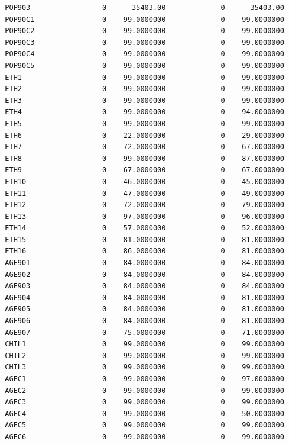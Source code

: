 \documentclass[
  11pt,
  a4paper,
  DIV=12,captions=tableheading,oneside,titlepage]{scrbook}
\begin{document}
\begin{verbatim}
  POP903                 0      35403.00             0      35403.00 
  POP90C1                0    99.0000000             0    99.0000000 
  POP90C2                0    99.0000000             0    99.0000000 
  POP90C3                0    99.0000000             0    99.0000000 
  POP90C4                0    99.0000000             0    99.0000000 
  POP90C5                0    99.0000000             0    99.0000000 
  ETH1                   0    99.0000000             0    99.0000000 
  ETH2                   0    99.0000000             0    99.0000000 
  ETH3                   0    99.0000000             0    99.0000000 
  ETH4                   0    99.0000000             0    94.0000000 
  ETH5                   0    99.0000000             0    99.0000000 
  ETH6                   0    22.0000000             0    29.0000000 
  ETH7                   0    72.0000000             0    67.0000000 
  ETH8                   0    99.0000000             0    87.0000000 
  ETH9                   0    67.0000000             0    67.0000000 
  ETH10                  0    46.0000000             0    45.0000000 
  ETH11                  0    47.0000000             0    49.0000000 
  ETH12                  0    72.0000000             0    79.0000000 
  ETH13                  0    97.0000000             0    96.0000000 
  ETH14                  0    57.0000000             0    52.0000000 
  ETH15                  0    81.0000000             0    81.0000000 
  ETH16                  0    86.0000000             0    81.0000000 
  AGE901                 0    84.0000000             0    84.0000000 
  AGE902                 0    84.0000000             0    84.0000000 
  AGE903                 0    84.0000000             0    84.0000000 
  AGE904                 0    84.0000000             0    81.0000000 
  AGE905                 0    84.0000000             0    81.0000000 
  AGE906                 0    84.0000000             0    81.0000000 
  AGE907                 0    75.0000000             0    71.0000000 
  CHIL1                  0    99.0000000             0    99.0000000 
  CHIL2                  0    99.0000000             0    99.0000000 
  CHIL3                  0    99.0000000             0    99.0000000 
  AGEC1                  0    99.0000000             0    97.0000000 
  AGEC2                  0    99.0000000             0    99.0000000 
  AGEC3                  0    99.0000000             0    99.0000000 
  AGEC4                  0    99.0000000             0    50.0000000 
  AGEC5                  0    99.0000000             0    99.0000000 
  AGEC6                  0    99.0000000             0    99.0000000 

\end{verbatim}
\end{document}
